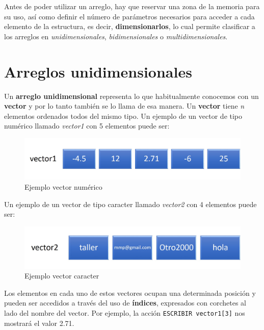 \documentclass[]{book}
\begin{document}
Antes de poder utilizar un arreglo, hay que reservar una zona de la memoria para su uso, así como definir el número de parámetros necesarios para acceder a cada elemento de la estructura, es decir, \textbf{dimensionarlos}, lo cual permite clasificar a los arreglos en \emph{unidimensionales}, \emph{bidimensionales} o \emph{multidimensionales}.

\hypertarget{arreglos-unidimensionales}{%
\section{Arreglos unidimensionales}\label{arreglos-unidimensionales}}

Un \textbf{arreglo unidimensional} representa lo que habitualmente conocemos con un \textbf{vector} y por lo tanto también se lo llama de esa manera. Un \textbf{vector} tiene \emph{n} elementos ordenados todos del mismo tipo. Un ejemplo de un vector de tipo numérico llamado \emph{vector1} con 5 elementos puede ser:

\begin{figure}

{\centering \includegraphics[width=0.8\linewidth]{images/10_vector1} 

}

\caption{Ejemplo vector numérico}\label{fig:vector1}
\end{figure}

Un ejemplo de un vector de tipo caracter llamado \emph{vector2} con 4 elementos puede ser:

\begin{figure}

{\centering \includegraphics[width=0.8\linewidth]{images/11_vector2} 

}

\caption{Ejemplo vector caracter}\label{fig:vector2}
\end{figure}

Los elementos en cada uno de estos vectores ocupan una determinada posición y pueden ser accedidos a través del uso de \textbf{índices}, expresados con corchetes al lado del nombre del vector. Por ejemplo, la acción \texttt{ESCRIBIR\ vector1{[}3{]}} nos mostrará el valor 2.71.
\end{document}

